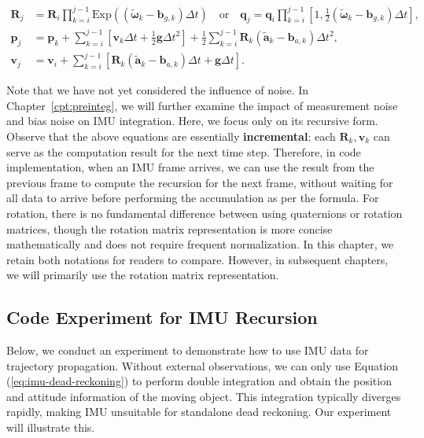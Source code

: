 \begin{subequations}\label{eq:imu-dead-reckoning}
	\begin{align}
		\bm{R}_j &= \bm{R}_i \prod_{k=i}^{j-1}\mathrm{Exp} \left(\left(\tilde{\boldsymbol{\omega}}_k - 
		\bm{b}_{g,k}\right) \Delta t\right) \quad \text{or}\quad \bm{q}_j = \bm{q}_i \prod_{k=i}^{j-1} \left[1, 
		\frac{1}{2} \left(\tilde{\boldsymbol{\omega}}_k - \bm{b}_{g,k}\right) \Delta t \right], \\
		\bm{p}_j &= \bm{p}_k + \sum_{k=i}^{j-1} \left[\bm{v}_k \Delta t + \frac{1}{2} \bm{g} \Delta t^2\right] + 
		\frac{1}{2} \sum_{k=i}^{j-1} \bm{R}_k \left(\tilde{\bm{a}}_k - \bm{b}_{a,k} \right) \Delta t^2, \\
		\bm{v}_j &= \bm{v}_i + \sum_{k=i}^{j-1}\left[ \bm{R}_k\left(\tilde{\bm{a}}_k - \bm{b}_{a,k} \right) 
		\Delta t+ \bm{g} \Delta t  \right].
	\end{align}
\end{subequations}

Note that we have not yet considered the influence of noise. In Chapter~\ref{cpt:preinteg}, we will further examine the impact of measurement noise and bias noise on IMU integration. Here, we focus only on its recursive form. Observe that the above equations are essentially \textbf{incremental}: each $\bm{R}_k, \bm{v}_k$ can serve as the computation result for the next time step. Therefore, in code implementation, when an IMU frame arrives, we can use the result from the previous frame to compute the recursion for the next frame, without waiting for all data to arrive before performing the accumulation as per the formula. For rotation, there is no fundamental difference between using quaternions or rotation matrices, though the rotation matrix representation is more concise mathematically and does not require frequent normalization. In this chapter, we retain both notations for readers to compare. However, in subsequent chapters, we will primarily use the rotation matrix representation.

\subsection{Code Experiment for IMU Recursion}
Below, we conduct an experiment to demonstrate how to use IMU data for trajectory propagation. Without external observations, we can only use Equation (\ref{eq:imu-dead-reckoning}) to perform double integration and obtain the position and attitude information of the moving object. This integration typically diverges rapidly, making IMU unsuitable for standalone dead reckoning. Our experiment will illustrate this.

